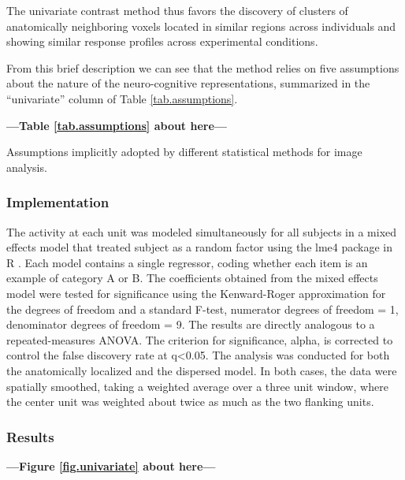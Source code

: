 The univariate contrast method thus favors the discovery of clusters of anatomically neighboring voxels located in similar regions across individuals and showing similar response profiles across experimental conditions. 

From this brief description we can see that the method relies on five assumptions about the nature of the neuro-cognitive representations, summarized in the ``univariate'' column of Table \ref{tab.assumptions}.

\begin{center}
	\textbf{---Table \ref{tab.assumptions} about here---}
\end{center}

\begin{table}
	
	\caption{Assumptions implicitly adopted by different statistical methods for image analysis.}
	\label{tab.assumptions}
\end{table}

\subsubsection{Implementation}
The activity at each unit was modeled simultaneously for all subjects in a mixed effects model that treated subject as a random factor \cite{chen_linear_2013, friston_mixed-effects_2005} using the lme4 package in R \cite{bates_linear_2013}. Each model contains a single regressor, coding whether each item is an example of category A or B. The coefficients obtained from the mixed effects model were tested for significance using the Kenward-Roger approximation for the degrees of freedom \cite{kenward_small_1997} and a standard F-test, numerator degrees of freedom = 1, denominator degrees of freedom = 9. The results are directly analogous to a repeated-measures ANOVA. The criterion for significance, alpha, is corrected to control the false discovery rate at q<0.05. The analysis was conducted for both the anatomically localized and the dispersed model. In both cases, the data were spatially smoothed, taking a weighted average over a three unit window, where the center unit was weighted about twice as much as the two flanking units.

\subsubsection{Results} 

\begin{center}
\textbf{---Figure \ref{fig.univariate} about here---}
\end{center}

